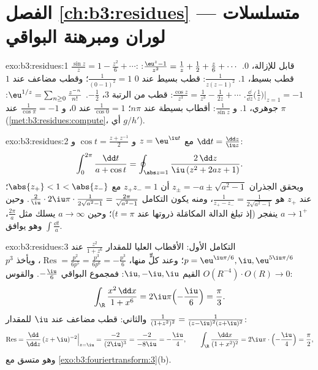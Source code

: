 \section*{الفصل \ref{ch:b3:residues} --- متسلسلات لوران
ومبرهنة البواقي}

\begin{solution}{exo:b3:residues:1}
$\frac{\sin z}z = 1 - \frac{z^2}6 + \cdots$: قابل للإزالة،  $0$. $\frac{\eu^z - 1}{z^2} = \frac1z + \frac12 +
\frac z6 + \cdots$: قطب بسيط،  $1$.
$\frac1{z(z-1)^2}$: قطب بسيط عند $0$  $\frac1{(0-1)^2} = 1$؛ وقطب مضاعف عند $1$ 
$\frac{\dd}{\dd z}\bigl(\frac1z\bigr)\big|_{z=1} = -1$.
$\frac{\cos z}{z^3} = \frac1{z^3} - \frac1{2z} + \cdots$: قطب من الرتبة $3$،  $-\frac12$. $\eu^{1/z} = \sum_{n\geq0}
\frac{z^{-n}}{n!}$: جوهري،
 $1$. و $\frac1{\sin z}$: أقطاب بسيطة عند $n\pi$؛
 $\frac1{\cos 0} = 1$ عند $0$، و $\frac1{\cos\pi} = -1$ عند $\pi$ (\cref{met:b3:residues:compute}، أي
$g/h'$).
\end{solution}

\begin{solution}{exo:b3:residues:2}
مع $z = \eu^{\iu t}$ و $\cos t = \frac{z + z^{-1}}2$ و $\dd t
= \frac{\dd z}{\iu z}$:
\[
\int_0^{2\pi}\frac{\dd t}{a + \cos t}
= \oint_{\abs z = 1}\frac{2\,\dd z}{\iu\,(z^2 + 2az + 1)} .
\]
ويحقق الجذران $z_\pm = -a \pm \sqrt{a^2 - 1}$ أن $z_+z_- =
1$ مع $\abs{z_+} < 1 < \abs{z_-}$؛  عند $z_+$ هو
$\frac{1}{z_+ - z_-} = \frac1{2\sqrt{a^2-1}}$، ومنه يكون التكامل $\frac2\iu\cdot2\iu\pi\cdot\frac1{2\sqrt{a^2-1}} =
\frac{2\pi}{\sqrt{a^2-1}}$. وحين $a \to 1^+$ ينفجر (إذ
تبلغ الدالة المكامَلة ذروتها عند $t = \pi$)؛ وحين
$a \to \infty$ يسلك مثل $\frac{2\pi}a$، وهو يوافق $\int\frac{\dd t}a$.
\end{solution}

\begin{solution}{exo:b3:residues:3}
التكامل الأول: الأقطاب العليا للمقدار $\frac{z^2}{1+z^6}$ عند $p =
\eu^{\iu\pi/6}, \iu, \eu^{5\iu\pi/6}$؛ وعند
كلٍّ منها، $\operatorname{Res} = \frac{p^2}{6p^5} = \frac{p^3}{6p^6} =
-\frac{p^3}6$، ويأخذ $p^3$ القيم $\iu, -\iu, \iu$: فمجموع
البواقي $-\frac{\iu}{6}$. والقوس $O(R^{-4})\cdot O(R) \to 0$:
\[
\int_\R\frac{x^2\,\dd x}{1 + x^6} =
2\iu\pi\Bigl(-\frac \iu6\Bigr) = \frac\pi3 .
\]
والثاني: قطب مضاعف عند $\iu$ للمقدار $\frac1{(1+z^2)^2} =
\frac1{(z-\iu)^2(z+\iu)^2}$:
\[
\operatorname{Res} = \frac{\dd}{\dd z}\,(z +
\iu)^{-2}\Big|_{z=\iu} = \frac{-2}{(2\iu)^3} =
\frac{-2}{-8\iu} = -\frac\iu4,
\qquad
\int_\R\frac{\dd x}{(1+x^2)^2} =
2\iu\pi\cdot\Bigl(-\frac\iu4\Bigr) = \frac\pi2 ,
\]
وهو متسق مع \cref{exo:b3:fouriertransform:3}(b).
\end{solution}

